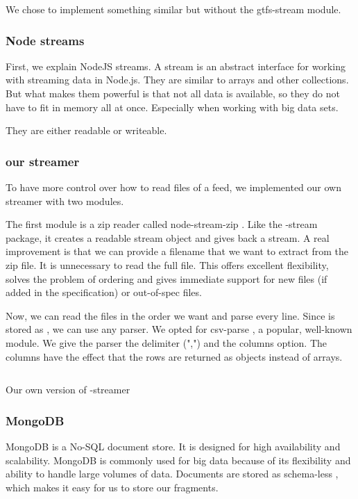 We chose to implement something similar but without the gtfs-stream module. 
\subsubsection{Node streams}
First, we explain NodeJS streams. A stream is an abstract interface for working with streaming data in Node.js. \cite{noauthor_stream_nodate} They are similar to arrays and other collections. But what makes them powerful is that not all data is available, so they do not have to fit in memory all at once. Especially when working with big data sets.

They are either readable or writeable.

\subsubsection{our  streamer}
To have more control over how to read files of a  feed, we implemented our own  streamer with two modules.



The first module is a zip reader called node-stream-zip \cite{noauthor_node-stream-zip_2021}. Like the -stream package, it creates a readable stream object and gives back a stream. A real improvement is that we can provide a filename that we want to extract from the zip file. It is unnecessary to read the full  file. This offers excellent flexibility, solves the problem of ordering and gives immediate support for new files (if added in the  specification) or out-of-spec files.

Now, we can read the files in the order we want and parse every line. Since  is stored as , we can use any  parser. We opted for csv-parse \cite{noauthor_csv-parse_2024}, a popular, well-known module. We give the parser the delimiter (",") and the columns option. The columns have the effect that the rows are returned as  objects instead of arrays.

\begin{listing}[H]
\inputminted[linenos,frame=single,breaklines]{TypeScript}{code/own_gtfs_streamer.js}
    \caption{Our own version of -streamer}
\label{listing:gtfs:streamer}
\end{listing}

\subsubsection{MongoDB}
MongoDB\cite{noauthor_mongodb_nodate} is a No-SQL document store. It is designed for high availability and scalability. MongoDB is commonly used for big data because of its flexibility and ability to handle large volumes of data. Documents are stored as schema-less , which makes it easy for us to store our  fragments. 
